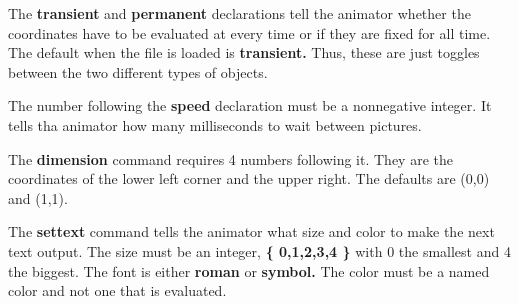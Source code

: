 \documentclass{article}
\begin{document}
The {\bf transient} and {\bf permanent} declarations tell the animator
whether the coordinates have to be evaluated at every time or if they
are fixed for all time.  The default when the file is loaded is {\bf
transient.}  Thus, these are just toggles between the two different
types of objects. 

The number following the {\bf speed} declaration must be a nonnegative
integer. It tells tha animator how many milliseconds to wait between
pictures. 

The {\bf dimension} command requires 4 numbers following it. They are
the coordinates of the lower left corner and the upper right. The
defaults are (0,0) and (1,1).  

The {\bf settext} command tells the animator what size and color to
make the next text output. The size must be an integer, {\bf \{
0,1,2,3,4 \} } with 0 the smallest and 4 the biggest. The font is
either {\bf roman} or {\bf symbol.}  The color must be a named color
and not one that is evaluated. 
\end{document}

